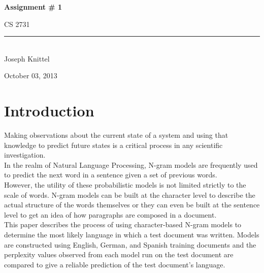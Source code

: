 \documentclass[a4,10pt]{article}
\newcommand{\HRule}{\rule{\linewidth}{0.5mm}}
\begin{document}
\begin{titlepage}
\begin{center}
 

\vspace*{75mm}

{ \huge \bfseries Assignment \# 1 \\[0.4cm] }

\textsc{\LARGE CS 2731 }

\HRule \\[2.5mm]

{ \large Joseph Knittel }






\vfill

{\large October 03, 2013}

\end{center}
\end{titlepage}















\section{Introduction}


Making observations about the current state of a system and using that knowledge to predict future states is a critical process in any scientific investigation. \\

In the realm of Natural Language Processing, N-gram models are frequently used to predict the next word in a sentence given a set of previous words. \\

However, the utility of these probabilistic models is not limited strictly to the scale of words. N-gram models can be built at the character level to describe the actual structure of the words themselves or they can even be built at the sentence level to get an idea of how paragraphs are composed in a document. \\

This paper describes the process of using character-based N-gram models to determine the most likely language in which a test document was written. Models are constructed using English, German, and Spanish training documents and the perplexity values observed from each model run on the test document are compared to give a reliable prediction of the test document's language.   
\end{document}
